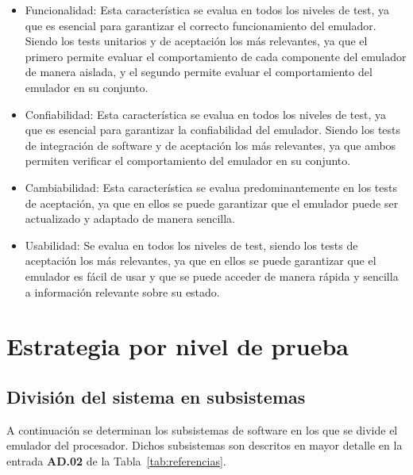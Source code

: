 \documentclass[
  11pt, %
  codirector, %
]{charter}
\begin{document}
\begin{itemize}
\item Funcionalidad: Esta característica se evalua en todos los niveles de test, ya que es esencial para garantizar el correcto funcionamiento del emulador. Siendo los tests unitarios y de aceptación los más relevantes, ya que el primero permite evaluar el comportamiento de cada componente del emulador de manera aislada, y el segundo permite evaluar el comportamiento del emulador en su conjunto.
\item Confiabilidad: Esta característica se evalua en todos los niveles de test, ya que es esencial para garantizar la confiabilidad del emulador. Siendo los tests de integración de software y de aceptación los más relevantes, ya que ambos permiten verificar el comportamiento del emulador en su conjunto.
\item Cambiabilidad: Esta característica se evalua predominantemente en los tests de aceptación, ya que en ellos se puede garantizar que el emulador puede ser actualizado y adaptado de manera sencilla.
\item Usabilidad: Se evalua en todos los niveles de test, siendo los tests de aceptación los más relevantes, ya que en ellos se puede garantizar que el emulador es fácil de usar y que se puede acceder de manera rápida y sencilla a información relevante sobre su estado.
\end{itemize}


\section{Estrategia por nivel de prueba}
\label{sec:estrategia_por_nivel_de_prueba}

\subsection{División del sistema en subsistemas}
\label{sec:division_del_sistema_en_subsistemas}

A continuación se determinan los subsistemas de software en los que se divide el emulador del procesador. Dichos subsistemas son descritos en mayor detalle en la entrada \textbf{AD.02} de la Tabla~\ref{tab:referencias}.
\end{document}
